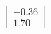 \documentclass[preview]{standalone}
\begin{document}
\begin{align*}
\begin{bmatrix} -0.36 \\ 1.70 \end{bmatrix}
\end{align*}
\end{document}
